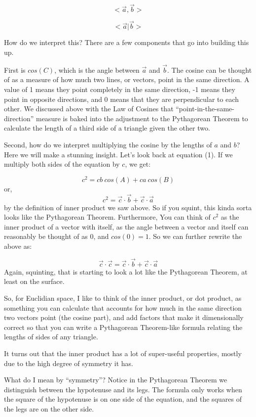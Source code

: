 \documentclass[
]{book}
\begin{document}
\[ <\vec{a}, \vec{b}>\]

\[ <\vec{a}|\vec{b}>\]

How do we interpret this? There are a few components that go into building this up.

First is \(cos(C)\), which is the angle between \(\vec{a}\) and \(\vec{b}\). The cosine can be thought of as a measure of how much two lines, or vectors, point in the same direction. A value of 1 means they point completely in the same direction, -1 means they point in opposite directions, and 0 means that they are perpendicular to each other. We discussed above with the Law of Cosines that ``point-in-the-same-direction'' measure is baked into the adjustment to the Pythagorean Theorem to calculate the length of a third side of a triangle given the other two.

Second, how do we interpret multiplying the cosine by the lengths of \(a\) and \(b\)? Here we will make a stunning insight. Let's look back at equation (1). If we multiply both sides of the equation by \(c\), we get:

\[c^2 = cb\ cos(A) + ca\ cos(B)\]
or,
\[c^2 = \vec{c}\cdot\vec{b} + \vec{c}\cdot\vec{a}\]
by the definition of inner product we saw above. So if you squint, this kinda sorta looks like the Pythagorean Theorem. Furthermore, You can think of \(c^2\) as the inner product of a vector with itself, as the angle between a vector and itself can reasonably be thought of as 0, and \(cos(0) = 1\). So we can further rewrite the above as:

\[\vec{c}\cdot\vec{c} = \vec{c}\cdot\vec{b} + \vec{c}\cdot\vec{a}\]
Again, squinting, that is starting to look a lot like the Pythagorean Theorem, at least on the surface.

So, for Euclidian space, I like to think of the inner product, or dot product, as something you can calculate that accounts for how much in the same direction two vectors point (the cosine part), and add factors that make it dimensionally correct so that you can write a Pythagorean Theorem-like formula relating the lengths of sides of any triangle.

It turns out that the inner product has a lot of super-useful properties, mostly due to the high degree of symmetry it has.

What do I mean by ``symmetry''? Notice in the Pythagorean Theorem we distinguish between the hypotenuse and its legs. The formula only works when the square of the hypotenuse is on one side of the equation, and the squares of the legs are on the other side.
\end{document}
